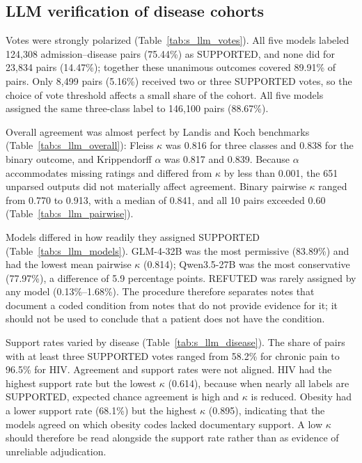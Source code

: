 \documentclass[unnumsec,webpdf,contemporary,large]{oup-authoring-template}
\begin{document}
\subsection{LLM verification of disease cohorts}

Votes were strongly polarized (Table~\ref{tab:s_llm_votes}). All five models labeled 124,308 admission--disease pairs (75.44\%) as SUPPORTED, and none did for 23,834 pairs (14.47\%); together these unanimous outcomes covered 89.91\% of pairs. Only 8,499 pairs (5.16\%) received two or three SUPPORTED votes, so the choice of vote threshold affects a small share of the cohort. All five models assigned the same three-class label to 146,100 pairs (88.67\%).

Overall agreement was almost perfect by Landis and Koch benchmarks (Table~\ref{tab:s_llm_overall}): Fleiss \(\kappa\) was 0.816 for three classes and 0.838 for the binary outcome, and Krippendorff \(\alpha\) was 0.817 and 0.839. Because \(\alpha\) accommodates missing ratings and differed from \(\kappa\) by less than 0.001, the 651 unparsed outputs did not materially affect agreement. Binary pairwise \(\kappa\) ranged from 0.770 to 0.913, with a median of 0.841, and all 10 pairs exceeded 0.60 (Table~\ref{tab:s_llm_pairwise}).

Models differed in how readily they assigned SUPPORTED (Table~\ref{tab:s_llm_models}). GLM-4-32B was the most permissive (83.89\%) and had the lowest mean pairwise \(\kappa\) (0.814); Qwen3.5-27B was the most conservative (77.97\%), a difference of 5.9 percentage points. REFUTED was rarely assigned by any model (0.13\%--1.68\%). The procedure therefore separates notes that document a coded condition from notes that do not provide evidence for it; it should not be used to conclude that a patient does not have the condition.

Support rates varied by disease (Table~\ref{tab:s_llm_disease}). The share of pairs with at least three SUPPORTED votes ranged from 58.2\% for chronic pain to 96.5\% for HIV. Agreement and support rates were not aligned. HIV had the highest support rate but the lowest \(\kappa\) (0.614), because when nearly all labels are SUPPORTED, expected chance agreement is high and \(\kappa\) is reduced. Obesity had a lower support rate (68.1\%) but the highest \(\kappa\) (0.895), indicating that the models agreed on which obesity codes lacked documentary support. A low \(\kappa\) should therefore be read alongside the support rate rather than as evidence of unreliable adjudication.
\end{document}
